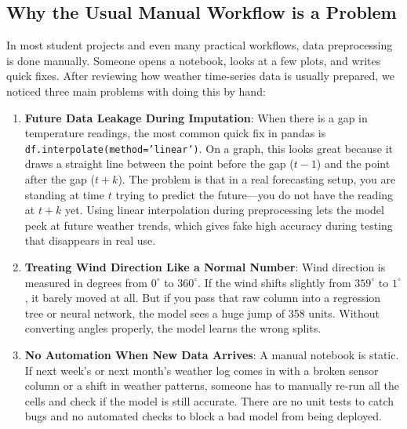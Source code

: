 \documentclass[conference]{IEEEtran}
\begin{document}
\subsection{Why the Usual Manual Workflow is a Problem}
In most student projects and even many practical workflows, data preprocessing is done manually. Someone opens a notebook, looks at a few plots, and writes quick fixes. After reviewing how weather time-series data is usually prepared, we noticed three main problems with doing this by hand:
\begin{enumerate}
    \item \textbf{Future Data Leakage During Imputation}: When there is a gap in temperature readings, the most common quick fix in pandas is \texttt{df.interpolate(method='linear')}. On a graph, this looks great because it draws a straight line between the point before the gap ($t-1$) and the point after the gap ($t+k$). The problem is that in a real forecasting setup, you are standing at time $t$ trying to predict the future---you do not have the reading at $t+k$ yet. Using linear interpolation during preprocessing lets the model peek at future weather trends, which gives fake high accuracy during testing that disappears in real use.
    \item \textbf{Treating Wind Direction Like a Normal Number}: Wind direction is measured in degrees from $0^\circ$ to $360^\circ$. If the wind shifts slightly from $359^\circ$ to $1^\circ$, it barely moved at all. But if you pass that raw column into a regression tree or neural network, the model sees a huge jump of 358 units. Without converting angles properly, the model learns the wrong splits.
    \item \textbf{No Automation When New Data Arrives}: A manual notebook is static. If next week's or next month's weather log comes in with a broken sensor column or a shift in weather patterns, someone has to manually re-run all the cells and check if the model is still accurate. There are no unit tests to catch bugs and no automated checks to block a bad model from being deployed.
\end{enumerate}
\end{document}
